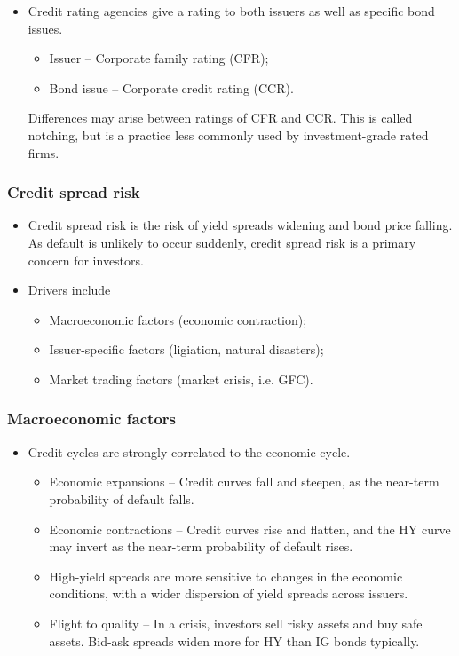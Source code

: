 \documentclass[../notes_compiled.tex]{subfiles}
\begin{document}
\begin{itemize}
\item Credit rating agencies give a rating to both issuers as well as specific bond issues.
\begin{itemize}
\item Issuer -- Corporate family rating (CFR);
\item Bond issue -- Corporate credit rating (CCR).
\end{itemize}
Differences may arise between ratings of CFR and CCR. This is called notching, but is a practice less commonly used by investment-grade rated firms.
\end{itemize}


\subsubsection{Credit spread risk}
\begin{itemize}
\item Credit spread risk is the risk of yield spreads widening and bond price falling. As default is unlikely to occur suddenly, credit spread risk is a primary concern for investors.
\item Drivers include
\begin{itemize}
\item Macroeconomic factors (economic contraction);
\item Issuer-specific factors (ligiation, natural disasters);
\item Market trading factors (market crisis, i.e. GFC).
\end{itemize}
\end{itemize}

\subsubsection*{Macroeconomic factors}
\begin{itemize}
\item Credit cycles are strongly correlated to the economic cycle.
\begin{itemize}
\item Economic expansions -- Credit curves fall and steepen, as the near-term probability of default falls.
\item Economic contractions -- Credit curves rise and flatten, and the HY curve may invert as the near-term probability of default rises.
\item High-yield spreads are more sensitive to changes in the economic conditions, with a wider dispersion of yield spreads across issuers.
\item Flight to quality -- In a crisis, investors sell risky assets and buy safe assets. Bid-ask spreads widen more for HY than IG bonds typically.
\end{itemize}
\end{itemize}
\end{document}
